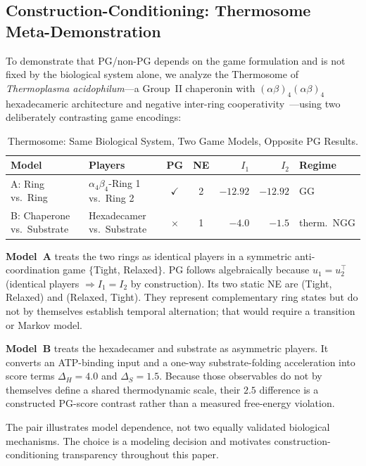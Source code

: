 \documentclass[12pt,a4paper]{article}
\begin{document}
\subsection[Construction-Conditioning: Thermosome]{Construction-Conditioning: Thermosome\\ Meta-Demonstration}
\label{sec:thermosome}

To demonstrate that PG/non-PG depends on the game formulation and is
not fixed by the biological system alone, we analyze the Thermosome of
\emph{Thermoplasma acidophilum}---a Group~II chaperonin with
$(\alpha\beta)_4(\alpha\beta)_4$ hexadecameric architecture and negative
inter-ring cooperativity~\cite{Bigotti2008,Gutsche2000}---using two deliberately
contrasting game encodings:

\begin{table}[!htbp]
\centering
\caption{Thermosome: Same Biological System, Two Game Models, Opposite
PG Results.}
\label{tab:thermosome}
\footnotesize
\begin{tabularx}{\textwidth}{@{}L{0.22\textwidth}YccrrL{0.13\textwidth}@{}}
\toprule
Model & Players & PG & NE & $I_1$ & $I_2$ & Regime \\
\midrule
A: Ring vs.\ Ring & $\alpha_4\beta_4$-Ring 1 vs.\ Ring 2 &
  $\checkmark$ & 2 & $-12.92$ & $-12.92$ & GG \\
B: Chaperone vs.\ Substrate & Hexadecamer vs.\ Substrate &
  $\times$ & 1 & $-4.0$ & $-1.5$ & therm.\ NGG \\
\bottomrule
\end{tabularx}
\end{table}

\textbf{Model~A} treats the two rings as identical players in a symmetric
anti-coordination game $\{$Tight, Relaxed$\}$. PG follows algebraically
because $u_1 = u_2^\top$ (identical players $\Rightarrow I_1 = I_2$ by
construction). Its two static NE are (Tight, Relaxed) and
(Relaxed, Tight). They represent complementary ring states but do not
by themselves establish temporal alternation; that would require a
transition or Markov model.

\textbf{Model~B} treats the hexadecamer and substrate as asymmetric
players. It converts an ATP-binding input and a one-way substrate-folding
acceleration into score terms $\Delta_H=4.0$ and $\Delta_S=1.5$.
Because those observables do not by themselves define a shared
thermodynamic scale, their $2.5$ difference is a constructed PG-score
contrast rather than a measured free-energy violation.

The pair illustrates model dependence, not two equally validated
biological mechanisms. The choice is a modeling decision and motivates
construction-conditioning transparency throughout this paper.
\end{document}
